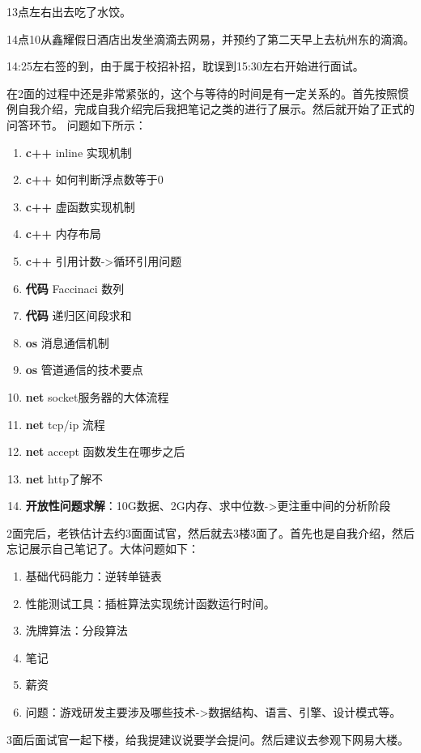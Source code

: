 \documentclass[UTF8,a4paper,8pt]{ctexart}
\begin{document}
	 	 13点左右出去吃了水饺。
	 	 
	 	 14点10从鑫耀假日酒店出发坐滴滴去网易，并预约了第二天早上去杭州东的滴滴。
	 	 
	 	 14:25左右签的到，由于属于校招补招，耽误到15:30左右开始进行面试。
	 	 
	 	 在2面的过程中还是非常紧张的，这个与等待的时间是有一定关系的。首先按照惯例自我介绍，完成自我介绍完后我把笔记之类的进行了展示。然后就开始了正式的问答环节。
	 	 问题如下所示：
		 	 \begin{enumerate}[itemindent = 1em]
		 	 	\item \textbf{c++} inline 实现机制
		 	 	\item \textbf{c++} 如何判断浮点数等于0
		 	 	\item \textbf{c++} 虚函数实现机制
		 	 	\item \textbf{c++} 内存布局
		 	 	\item \textbf{c++} 引用计数->循环引用问题
		 	 	\item \textbf{代码} Faccinaci 数列
		 	 	\item \textbf{代码} 递归区间段求和
		 	 	\item \textbf{os} 消息通信机制
		 	 	\item \textbf{os} 管道通信的技术要点
		 	 	\item \textbf{net} socket服务器的大体流程
		 	 	\item \textbf{net} tcp/ip 流程
		 	 	\item \textbf{net} accept 函数发生在哪步之后
		 	 	\item \textbf{net} http了解不
		 	 	\item \textbf{开放性问题求解}：10G数据、2G内存、求中位数->更注重中间的分析阶段
		 	 \end{enumerate}
		2面完后，老铁估计去约3面面试官，然后就去3楼3面了。首先也是自我介绍，然后忘记展示自己笔记了。大体问题如下：
			\begin{enumerate}[itemindent = 1em]
				\item 基础代码能力：逆转单链表
				\item 性能测试工具：插桩算法实现统计函数运行时间。
				\item 洗牌算法：分段算法
				\item 笔记
				\item 薪资
				\item 问题：游戏研发主要涉及哪些技术->数据结构、语言、引擎、设计模式等。
			\end{enumerate} 	 
		 3面后面试官一起下楼，给我提建议说要学会提问。然后建议去参观下网易大楼。
		 
\end{document}
